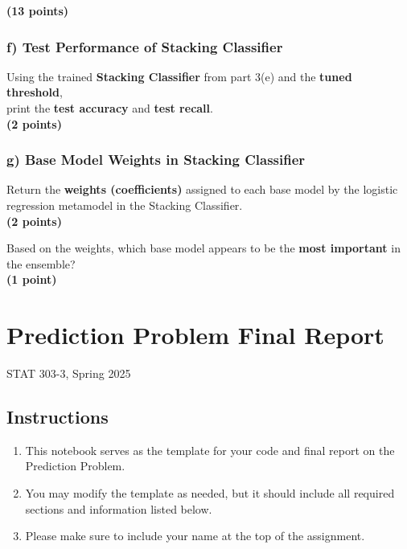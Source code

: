 \documentclass[
  letterpaper,
  DIV=11,
  numbers=noendperiod]{scrreprt}
\begin{document}
\textbf{(13 points)}

\subsection{f) Test Performance of Stacking
Classifier}\label{f-test-performance-of-stacking-classifier}

Using the trained \textbf{Stacking Classifier} from part 3(e) and the
\textbf{tuned threshold},\\
print the \textbf{test accuracy} and \textbf{test recall}.\\
\textbf{(2 points)}

\subsection{g) Base Model Weights in Stacking
Classifier}\label{g-base-model-weights-in-stacking-classifier}

Return the \textbf{weights (coefficients)} assigned to each base model
by the logistic regression metamodel in the Stacking Classifier.\\
\textbf{(2 points)}

Based on the weights, which base model appears to be the \textbf{most
important} in the ensemble?\\
\textbf{(1 point)}

\chapter{Prediction Problem Final
Report}\label{prediction-problem-final-report}

STAT 303-3, Spring 2025

\hfill\break

\section*{Instructions}\label{instructions-5}


\begin{enumerate}
\def\labelenumi{\arabic{enumi}.}
\item
  This notebook serves as the template for your code and final report on
  the Prediction Problem.
\item
  You may modify the template as needed, but it should include all
  required sections and information listed below.
\item
  Please make sure to include your name at the top of the assignment.
\end{enumerate}
\end{document}
